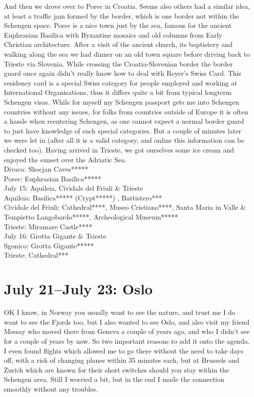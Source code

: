 And then we drove over to Porec in Croatia. Seems also others had a similar idea, at least a traffic jam formed by the border, which is one border not within the Schengen space. Porec is a nice town just by the sea, famous for the ancient Euphrasian Basilica with Byzantine mosaics and old columns from Early Christian architecture. After a visit of the ancient church, its baptistery and walking along the sea we had dinner on an old town square before driving back to Trieste via Slovenia. While crossing the Croatia-Slovenian border the border guard once again didn't really know how to deal with Reyer's Swiss Card. This residency card is a special Swiss category for people employed and working at International Organisations, thus it differs quite a bit from typical longterm Schengen visas. While for myself my Schengen passport gets me into Schengen countries without any issues, for folks from countries outside of Europe it is often a hassle when reentering Schengen, as one cannot expect a normal border guard to just have knowledge of such special categories. But a couple of minutes later we were let in (after all it is a valid category, and online this information can be checked too). Having arrived in Trieste, we got ourselves some ice cream and enjoyed the sunset over the Adriatic Sea.\\

Divaca: Skocjan Caves*****\\
Porec: Euphrasian Basilica*****\\

July 15: Aquileia, Cividale del Friuli \& Trieste\\
Aquileia: Basilica***** (Crypt*****) , Battistero***\\
Cividale del Friuli: Cathedral****, Museo Cristiano****, Santa Maria in Valle \& Tempietto Langobardo*****, Archeological Museum*****\\
Trieste: Miramare Castle****\\

July 16: Grotta Gigante \& Trieste\\
Sgonico: Grotta Gigante*****\\
Trieste: Cathedral***

\section{July 21--July 23: Oslo}
\label{Oslo2017}

OK I know, in Norway you usually want to see the nature, and trust me I do want to see the Fjords too, but I also wanted to see Oslo, and also visit my friend Messay who moved there from Geneva a couple of years ago, and who I didn't see for a couple of years by now. So two important reasons to add it onto the agenda. I even found flights which allowed me to go there without the need to take days off, with a risk of changing planes within 35 minutes each, but at Brussels and Zurich which are known for their short switches should you stay within the Schengen area. Still I worried a bit, but in the end I made the connection smoothly without any troubles.\\

